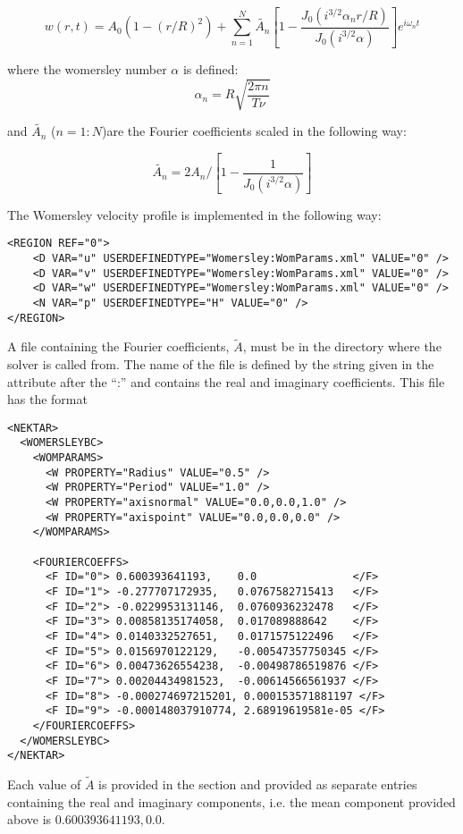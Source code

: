 $$ w(r,t) = A_0(1-(r/R)^2) + \sum_{n=1}^N
\tilde{A_n}[1-\frac{J_0(i^{3/2}\alpha_n r/R)}{J_0(i^{3/2}
    \alpha)}]e^{i\omega_n t} $$

where the womersley number $\alpha$ is defined:
$$ \alpha_n = R\sqrt{\frac{2\pi n}{T\nu}}$$

and $\tilde{A_n}$ ($n=1:N$)are the Fourier coefficients scaled in the
following way:

$$ \tilde{A_n} = 2A_n/[1 - \frac{1}{J_0(i^{3/2}\alpha)}] $$

The Womersley velocity profile is implemented in the following way:

\begin{lstlisting}[style=XMLStyle]
<REGION REF="0">
    <D VAR="u" USERDEFINEDTYPE="Womersley:WomParams.xml" VALUE="0" />
    <D VAR="v" USERDEFINEDTYPE="Womersley:WomParams.xml" VALUE="0" />
    <D VAR="w" USERDEFINEDTYPE="Womersley:WomParams.xml" VALUE="0" />
    <N VAR="p" USERDEFINEDTYPE="H" VALUE="0" />
</REGION>
\end{lstlisting}

A file containing the Fourier coefficients, $\tilde{A}$, must be in
the directory where the solver is called from. The name of the file is
defined by the string given in the attribute 
after the ``:'' and contains the real and imaginary coefficients. This
file has the format
\begin{lstlisting}[style=XMLStyle]
<NEKTAR>
  <WOMERSLEYBC>
    <WOMPARAMS>
      <W PROPERTY="Radius" VALUE="0.5" />
      <W PROPERTY="Period" VALUE="1.0" />
      <W PROPERTY="axisnormal" VALUE="0.0,0.0,1.0" />
      <W PROPERTY="axispoint" VALUE="0.0,0.0,0.0" />
    </WOMPARAMS>

    <FOURIERCOEFFS>
      <F ID="0"> 0.600393641193,    0.0               </F>
      <F ID="1"> -0.277707172935,   0.0767582715413   </F>
      <F ID="2"> -0.0229953131146,  0.0760936232478   </F>
      <F ID="3"> 0.00858135174058,  0.017089888642    </F>
      <F ID="4"> 0.0140332527651,   0.0171575122496   </F>
      <F ID="5"> 0.0156970122129,   -0.00547357750345 </F>
      <F ID="6"> 0.00473626554238,  -0.00498786519876 </F>
      <F ID="7"> 0.00204434981523,  -0.00614566561937 </F>
      <F ID="8"> -0.000274697215201, 0.000153571881197 </F>
      <F ID="9"> -0.000148037910774, 2.68919619581e-05 </F>
    </FOURIERCOEFFS>
  </WOMERSLEYBC>
</NEKTAR>
\end{lstlisting}

Each value of $\tilde{A}$ is provided in the 
section and provided as separate entries containing the real and
imaginary components, i.e. the mean component provided above is
$0.600393641193,0.0$.

